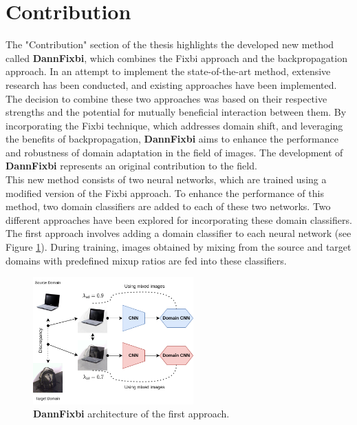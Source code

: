 \section{Contribution}
The "Contribution" section of the thesis highlights the developed new method called \textbf{DannFixbi}, which combines the Fixbi approach and the backpropagation approach. In an attempt to implement the state-of-the-art method, extensive research has been conducted, and existing approaches have been implemented. The decision to combine these two approaches was based on their respective strengths and the potential for mutually beneficial interaction between them. By incorporating the Fixbi technique, which addresses domain shift, and leveraging the benefits of backpropagation, \textbf{DannFixbi} aims to enhance the performance and robustness of domain adaptation in the field of images. The development of \textbf{DannFixbi} represents an original contribution to the field. \\

This new method consists of two neural networks, which are trained using a modified version of the Fixbi approach. To enhance the performance of this method, two domain classifiers are added to each of these two networks. Two different approaches have been explored for incorporating these domain classifiers.\\

The first approach involves adding a domain classifier to each neural network (see Figure \ref{fig:dannfixmix}). During training, images obtained by mixing from the source and target domains with predefined mixup ratios are fed into these classifiers. 

\begin{figure}[H]
    \centering
    \includegraphics[width=0.55\textwidth]{Figures/Results/df_mix.png}
    \caption{\textbf{DannFixbi} architecture of the first approach.}
    \label{fig:dannfixmix}
\end{figure}

